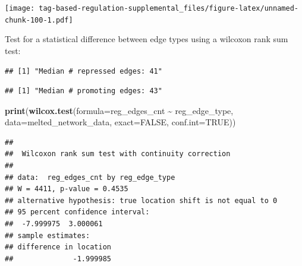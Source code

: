 \documentclass[
]{book}
\newenvironment{Shaded}{\begin{snugshade}}{\end{snugshade}}
\newcommand{\DataTypeTok}[1]{\textcolor[rgb]{0.13,0.29,0.53}{#1}}
\newcommand{\KeywordTok}[1]{\textcolor[rgb]{0.13,0.29,0.53}{\textbf{#1}}}
\newcommand{\NormalTok}[1]{#1}
\newcommand{\OperatorTok}[1]{\textcolor[rgb]{0.81,0.36,0.00}{\textbf{#1}}}
\newcommand{\OtherTok}[1]{\textcolor[rgb]{0.56,0.35,0.01}{#1}}
\newcommand{\StringTok}[1]{\textcolor[rgb]{0.31,0.60,0.02}{#1}}
\begin{document}
\texttt{[image: tag-based-regulation-supplemental\_files/figure-latex/unnamed-chunk-100-1.pdf]}

Test for a statistical difference between edge types using a wilcoxon rank sum test:

\begin{Shaded}
\end{Shaded}

\begin{verbatim}
## [1] "Median # repressed edges: 41"
\end{verbatim}

\begin{Shaded}
\end{Shaded}

\begin{verbatim}
## [1] "Median # promoting edges: 43"
\end{verbatim}

\begin{Shaded}
\begin{Highlighting}[]
\KeywordTok{print}\NormalTok{(}\KeywordTok{wilcox.test}\NormalTok{(}\DataTypeTok{formula=}\NormalTok{reg\_edges\_cnt }\OperatorTok{\textasciitilde{}}\StringTok{ }\NormalTok{reg\_edge\_type, }\DataTypeTok{data=}\NormalTok{melted\_network\_data, }\DataTypeTok{exact=}\OtherTok{FALSE}\NormalTok{, }\DataTypeTok{conf.int=}\OtherTok{TRUE}\NormalTok{))}
\end{Highlighting}
\end{Shaded}

\begin{verbatim}
## 
##  Wilcoxon rank sum test with continuity correction
## 
## data:  reg_edges_cnt by reg_edge_type
## W = 4411, p-value = 0.4535
## alternative hypothesis: true location shift is not equal to 0
## 95 percent confidence interval:
##  -7.999975  3.000061
## sample estimates:
## difference in location 
##              -1.999985
\end{verbatim}
\end{document}
